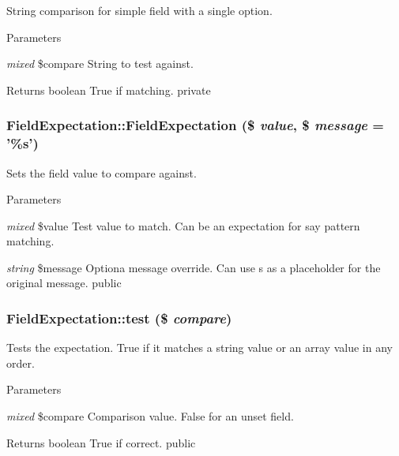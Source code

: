 \label{class_field_expectation_a4eef89d4a9de8a41a0981b3918523f5d}
String comparison for simple field with a single option. 
\begin{DoxyParams}{Parameters}
\item[{\em mixed}]\$compare String to test against. \end{DoxyParams}
\begin{DoxyReturn}{Returns}
boolean True if matching.  private 
\end{DoxyReturn}
\hypertarget{class_field_expectation_a4b7f7a62437287d18eb9eb6910694761}{
\subsubsection[{FieldExpectation}]{\setlength{\rightskip}{0pt plus 5cm}FieldExpectation::FieldExpectation (\$ {\em value}, \/  \$ {\em message} = {\ttfamily '\%s'})}}
\label{class_field_expectation_a4b7f7a62437287d18eb9eb6910694761}
Sets the field value to compare against. 
\begin{DoxyParams}{Parameters}
\item[{\em mixed}]\$value Test value to match. Can be an expectation for say pattern matching. \item[{\em string}]\$message Optiona message override. Can use s as a placeholder for the original message.  public \end{DoxyParams}
\hypertarget{class_field_expectation_a2c4a77d26920b75241f177d94e7b220e}{
\subsubsection[{test}]{\setlength{\rightskip}{0pt plus 5cm}FieldExpectation::test (\$ {\em compare})}}
\label{class_field_expectation_a2c4a77d26920b75241f177d94e7b220e}
Tests the expectation. True if it matches a string value or an array value in any order. 
\begin{DoxyParams}{Parameters}
\item[{\em mixed}]\$compare Comparison value. False for an unset field. \end{DoxyParams}
\begin{DoxyReturn}{Returns}
boolean True if correct.  public 
\end{DoxyReturn}


